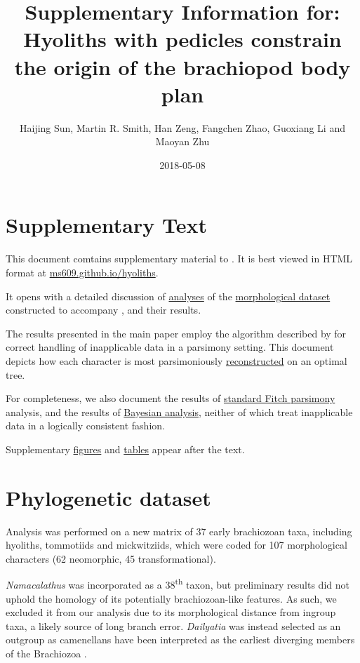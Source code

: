 \documentclass[openany]{book}
\title{Supplementary Information for: \newline\newline Hyoliths with pedicles
constrain the origin of the brachiopod body plan}
\author{Haijing Sun, Martin R. Smith, Han Zeng, Fangchen Zhao, Guoxiang Li and
Maoyan Zhu}
\date{2018-05-08}
\theoremstyle{definition}
\theoremstyle{definition}
\theoremstyle{definition}
\theoremstyle{remark}
\begin{document}
\maketitle

{
\setcounter{tocdepth}{1}
\tableofcontents
}
\chapter*{Supplementary Text}\label{supplementary-text}

This document comtains supplementary material to
\citet{Sun2018Hyolithswith}. It is best viewed in HTML format at
\href{https://ms609.github.io/hyoliths/}{ms609.github.io/hyoliths}.

It opens with a detailed discussion of
\protect\hyperlink{treesearch}{analyses} of the
\protect\hyperlink{dataset}{morphological dataset} constructed to
accompany \citet{Sun2018Hyolithswith}, and their results.

The results presented in the main paper employ the algorithm described
by \citet{Brazeau2018} for correct handling of inapplicable data in a
parsimony setting. This document depicts how each character is most
parsimoniously \protect\hyperlink{reconstructions}{reconstructed} on an
optimal tree.

For completeness, we also document the results of
\protect\hyperlink{fitch}{standard Fitch parsimony} analysis, and the
results of \protect\hyperlink{bayesian}{Bayesian analysis}, neither of
which treat inapplicable data in a logically consistent fashion.

Supplementary \protect\hyperlink{figures}{figures} and
\protect\hyperlink{table}{tables} appear after the text.

\hypertarget{dataset}{\chapter{Phylogenetic dataset}\label{dataset}}

Analysis was performed on a new matrix of 37 early brachiozoan taxa,
including hyoliths, tommotiids and mickwitziids, which were coded for
107 morphological characters (62 neomorphic, 45 transformational).

\emph{Namacalathus} was incorporated as a 38\textsuperscript{th} taxon,
but preliminary results did not uphold the homology of its potentially
brachiozoan-like features. As such, we excluded it from our analysis due
to its morphological distance from ingroup taxa, a likely source of long
branch error. \emph{Dailyatia} was instead selected as an outgroup as
camenellans have been interpreted as the earliest diverging members of
the Brachiozoa \citep{Skovsted2015Theearly, Zhao2017}.
\end{document}
